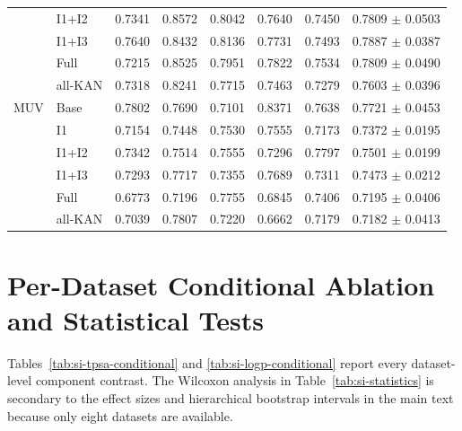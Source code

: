\documentclass[journal=jcisd8,manuscript=article]{achemso}
\begin{document}
\begin{landscape}
\begin{longtable}{llrrrrrr}
 & I1+I2 & 0.7341 & 0.8572 & 0.8042 & 0.7640 & 0.7450 & 0.7809 $\pm$ 0.0503 \\
 & I1+I3 & 0.7640 & 0.8432 & 0.8136 & 0.7731 & 0.7493 & 0.7887 $\pm$ 0.0387 \\
 & Full & 0.7215 & 0.8525 & 0.7951 & 0.7822 & 0.7534 & 0.7809 $\pm$ 0.0490 \\
 & all-KAN & 0.7318 & 0.8241 & 0.7715 & 0.7463 & 0.7279 & 0.7603 $\pm$ 0.0396 \\
\midrule
MUV & Base & 0.7802 & 0.7690 & 0.7101 & 0.8371 & 0.7638 & 0.7721 $\pm$ 0.0453 \\
 & I1 & 0.7154 & 0.7448 & 0.7530 & 0.7555 & 0.7173 & 0.7372 $\pm$ 0.0195 \\
 & I1+I2 & 0.7342 & 0.7514 & 0.7555 & 0.7296 & 0.7797 & 0.7501 $\pm$ 0.0199 \\
 & I1+I3 & 0.7293 & 0.7717 & 0.7355 & 0.7689 & 0.7311 & 0.7473 $\pm$ 0.0212 \\
 & Full & 0.6773 & 0.7196 & 0.7755 & 0.6845 & 0.7406 & 0.7195 $\pm$ 0.0406 \\
 & all-KAN & 0.7039 & 0.7807 & 0.7220 & 0.6662 & 0.7179 & 0.7182 $\pm$ 0.0413 \\
\bottomrule
\end{longtable}
\end{landscape}

\section{Per-Dataset Conditional Ablation and Statistical Tests}

Tables~\ref{tab:si-tpsa-conditional} and
\ref{tab:si-logp-conditional} report every dataset-level component contrast.
The Wilcoxon analysis in Table~\ref{tab:si-statistics} is secondary to the
effect sizes and hierarchical bootstrap intervals in the main text because
only eight datasets are available.
\end{document}
